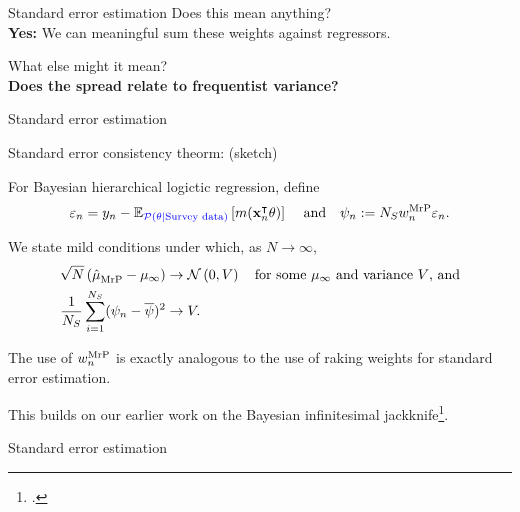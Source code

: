 




\begin{frame}[c]{Standard error estimation}
\centering
{
Does this mean anything?  \\
\textbf{Yes: }We can meaningful sum these weights against regressors.\\[1em]
}

{
What else might it mean?\\
\textbf{Does the spread relate to frequentist variance?}
}

\splitpagenoline{
    \AlexanderWeightPlot{}
}{
    \LaxWeightPlot{}
}
\end{frame}




\begin{frame}[c]{Standard error estimation}



\begin{block}{Standard error consistency theorm: (sketch)}

For Bayesian hierarchical logictic regression, define
$$
\varepsilon_n = y_n - \mathbb{E}_{\textcolor{blue}{\mathcal{P}(\theta \vert \textrm{Survey data})}}\left[ m(\mathbf{x}_n^\intercal \theta)\right]\,
\quad\textrm{and}\quad
\psi_n := {N_S} w_n^{\mathrm{MrP}} \varepsilon_n.
$$

We state mild conditions under which, as $N \rightarrow \infty$,
$$
\begin{aligned}
    \sqrt{N}\left(\hat{\mu}^{}_{\mathrm{MrP}} - \mu_\infty \right) \rightarrow{}&
    \mathcal{N}\left(0, V\right) \quad\textrm{for some $\mu_\infty$ and variance $V$, and}\\
\frac{1}{{N_S}} \sum_{i=1}^{N_S} (\psi_n - \overline{\psi})^2 \rightarrow{}& V.
\end{aligned}
$$
\end{block}

The use of $w_n^{\mathrm{MrP}}$ is exactly analogous to the use of raking weights
for standard error estimation.

This builds on our earlier work on the Bayesian
infinitesimal jackknife\footcite{giordano:2024:bayesij}.

\end{frame}



\begin{frame}[t]{Standard error estimation}
\BootstrapPlot{}
\end{frame}